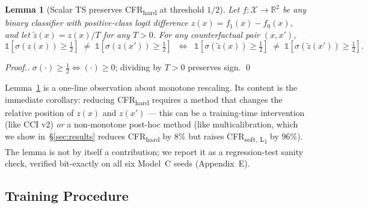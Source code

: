 \documentclass[10pt,a4paper]{article}
\newtheorem{lemma}{Lemma}
\begin{document}
\begin{lemma}[Scalar TS preserves CFR\textsubscript{hard} at threshold $1/2$]
\label{thm:ts-cfr}
Let $f : \mathcal{X} \to \mathbb{R}^2$ be any binary classifier with positive-class logit difference $z(x) = f_1(x) - f_0(x)$, and let $\tilde z(x) = z(x) / T$ for any $T > 0$. For any counterfactual pair $(x, x')$,
\begin{equation*}
\mathbb{1}[\sigma(z(x)) \ge \tfrac{1}{2}] \;\ne\; \mathbb{1}[\sigma(z(x')) \ge \tfrac{1}{2}]
\;\;\Longleftrightarrow\;\;
\mathbb{1}[\sigma(\tilde z(x)) \ge \tfrac{1}{2}] \;\ne\; \mathbb{1}[\sigma(\tilde z(x')) \ge \tfrac{1}{2}].
\end{equation*}
\end{lemma}
\begin{proof}[Proof.] $\sigma(\cdot) \ge \tfrac{1}{2} \iff (\cdot) \ge 0$; dividing by $T > 0$ preserves sign. \qed
\end{proof}

Lemma~\ref{thm:ts-cfr} is a one-line observation about monotone rescaling. Its content is the immediate corollary: reducing CFR\textsubscript{hard} requires a method that changes the relative position of $z(x)$ and $z(x')$ --- this can be a training-time intervention (like CCI v2) \emph{or} a non-monotone post-hoc method (like multicalibration, which we show in~\S\ref{sec:results} reduces CFR\textsubscript{hard} by $8\%$ but raises CFR\textsubscript{soft, L\textsubscript{1}} by $96\%$). The lemma is not by itself a contribution; we report it as a regression-test sanity check, verified bit-exactly on all six Model~C seeds (Appendix~E).

\subsection{Training Procedure}
\label{sec:training}
\end{document}

